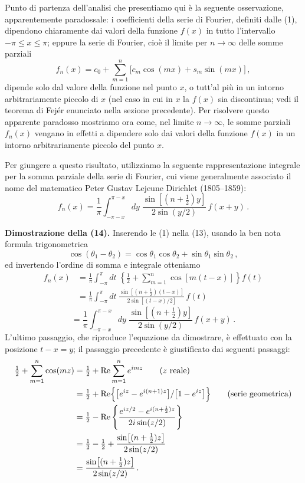 \documentclass[11pt, a4paper]{book}
\numberwithin{equation}{section}
\begin{document}
Punto di partenza dell'analisi che presentiamo qui è la seguente osservazione, apparentemente paradossale: i coefficienti della serie di Fourier, definiti dalle (1), dipendono chiaramente dai valori della funzione $f(x)$ in tutto l'intervallo $-\pi \leq x \leq \pi$; eppure la serie di Fourier, cioè il limite per $n\to\infty$ delle somme parziali
\begin{equation}
  f_n(x) = c_0 + \sum_{m=1}^{n}\bigl[c_m\cos(mx)+s_m\sin(mx)\bigr]\,, \tag{13}
\end{equation}
dipende solo dal valore della funzione nel punto $x$, o tutt'al più in un intorno arbitrariamente piccolo di $x$ (nel caso in cui in $x$ la $f(x)$ sia discontinua; vedi il teorema di Fejér enunciato nella sezione precedente). Per risolvere questo apparente paradosso mostriamo ora come, nel limite $n\to\infty$, le somme parziali $f_n(x)$ vengano in effetti a dipendere solo dai valori della funzione $f(x)$ in un intorno arbitrariamente piccolo del punto $x$.

Per giungere a questo risultato, utilizziamo la seguente rappresentazione integrale per la somma parziale della serie di Fourier, cui viene generalmente associato il nome del matematico Peter Gustav Lejeune Dirichlet (1805--1859):
\begin{equation}
  f_n(x) = \frac{1}{\pi}\int_{-\pi-x}^{\pi-x} dy\;
  \frac{\sin\!\left[(n+\frac{1}{2})y\right]}{2\sin(y/2)}\,f(x+y)\,. \tag{14}
\end{equation}

\textbf{Dimostrazione della (14).}
Inserendo le (1) nella (13), usando la ben nota formula trigonometrica
\[
  \cos(\theta_1-\theta_2) = \cos\theta_1\cos\theta_2 + \sin\theta_1\sin\theta_2\,,
\]
ed invertendo l'ordine di somma e integrale otteniamo
\begin{align*}
  f_n(x) &= \frac{1}{\pi}\int_{-\pi}^{\pi} dt\;\left\{\tfrac{1}{2}+\sum_{m=1}^{n}\cos[m(t-x)]\right\}f(t)\\
  &= \frac{1}{\pi}\int_{-\pi}^{\pi} dt\;\frac{\sin\!\left[(n+\frac{1}{2})(t-x)\right]}{2\sin[(t-x)/2]}\,f(t)
\end{align*}
\[
  = \frac{1}{\pi}\int_{-\pi-x}^{\pi-x} dy\;\frac{\sin\!\left[(n+\frac{1}{2})y\right]}{2\sin(y/2)}\,f(x+y)\,.
\]
L'ultimo passaggio, che riproduce l'equazione da dimostrare, è effettuato con la posizione $t-x=y$; il passaggio precedente è giustificato dai seguenti passaggi:
\begin{align*}
  \tfrac{1}{2}+\sum_{m=1}^{n}\cos(mz)
  &= \tfrac{1}{2} + \operatorname{Re}\sum_{m=1}^{n}e^{imz}
    \qquad(z \text{ reale})\\
  &= \tfrac{1}{2} + \operatorname{Re}\Bigl\{\bigl[e^{iz}-e^{i(n+1)z}\bigr]/\bigl[1-e^{iz}\bigr]\Bigr\}
    \qquad\text{(serie geometrica)}\\
  &= \tfrac{1}{2} - \operatorname{Re}\left\{\frac{e^{iz/2}-e^{i(n+\frac{1}{2})z}}{2i\sin(z/2)}\right\}\\
  &= \tfrac{1}{2} - \tfrac{1}{2} + \frac{\sin\!\left[(n+\frac{1}{2})z\right]}{2\sin(z/2)}\\
  &= \frac{\sin\!\left[(n+\frac{1}{2})z\right]}{2\sin(z/2)}\,.
\end{align*}
\end{document}
